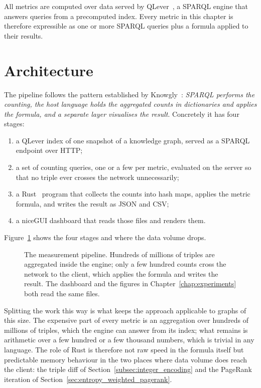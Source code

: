 All metrics are computed over data served by QLever~\cite{bast2017qlever}, a
SPARQL engine that answers queries from a precomputed index. Every metric in
this chapter is therefore expressible as one or more SPARQL queries plus a
formula applied to their results.

\section{Architecture}
\label{sec:architecture}

The pipeline follows the pattern established by Knowgly~\cite{garcia2025information}:
\emph{SPARQL performs the counting, the host language holds the aggregated counts
in dictionaries and applies the formula, and a separate layer visualises the
result}. Concretely it has four stages:

\begin{enumerate}
  \item a QLever index of one snapshot of a knowledge graph, served as a SPARQL
        endpoint over HTTP;
  \item a set of counting queries, one or a few per metric, evaluated on the
        server so that no triple ever crosses the network unnecessarily;
  \item a Rust~\cite{matsakis2014rust} program that collects the counts into hash maps, applies the
        metric formula, and writes the result as JSON and CSV;
  \item a niceGUI dashboard that reads those files and renders them.
\end{enumerate}

Figure~\ref{fig:pipeline} shows the four stages and where the data volume drops.

\begin{figure}[htbp]
  \centering
  \figpipeline
  \caption[]{The measurement pipeline. Hundreds of
    millions of triples are aggregated inside the engine; only a few hundred
    counts cross the network to the client, which applies the formula and writes
    the result. The dashboard and the figures in
    Chapter~\ref{chap:experiments} both read the same files.}
  \label{fig:pipeline}
\end{figure}

Splitting the work this way is what keeps the approach applicable to graphs of
this size. The expensive part of every metric is an aggregation over hundreds of
millions of triples, which the engine can answer from its index; what remains is
arithmetic over a few hundred or a few thousand numbers, which is trivial in any
language. The role of Rust is therefore not raw speed in the formula itself but
predictable memory behaviour in the two places where data volume does reach the
client: the triple diff of Section~\ref{subsec:integer_encoding} and the
PageRank iteration of Section~\ref{sec:entropy_weighted_pagerank}.


